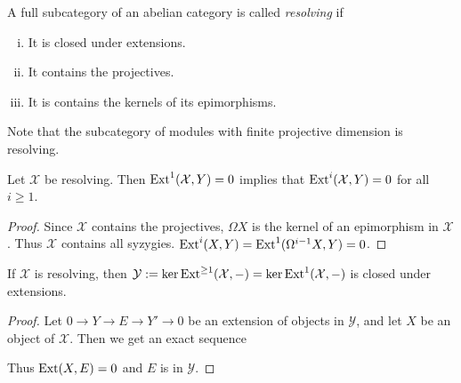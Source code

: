 
\begin{defn}[Resolving]
	A full subcategory of an abelian category is called \emph{resolving} if 
	\begin{enumerate}[i)]
		\item It is closed under extensions.
		\item It contains the projectives.
		\item It is contains the kernels of its epimorphisms.
	\end{enumerate}
\end{defn}

Note that the subcategory of modules with finite projective dimension is resolving.


\begin{lemma}\label{lem:resolving_ext_vanish}
	Let $\mathcal X$ be resolving. Then $\operatorname{Ext}^1(\mathcal X, Y) = 0$ implies that $\operatorname{Ext}^i(\mathcal X, Y)=0$ for all $i \geq 1$.
	\begin{proof}
		Since $\mathcal X$ contains the projectives, $\Omega X$ is the kernel of an epimorphism in $\mathcal X$. Thus $\mathcal X$ contains all syzygies. $\operatorname{Ext}^i(X, Y) = \operatorname{Ext}^1(\Omega^{i-1}X, Y) = 0$.
	\end{proof}
\end{lemma}

\begin{prop}\label{prop:complement_closed_under_extension}
	If $\mathcal X$ is resolving, then $\mathcal Y := \ker\operatorname{Ext}^{\geq 1}(\mathcal X, -) = \ker\operatorname{Ext}^{1}(\mathcal X, -)$ is closed under extensions.
	\begin{proof}
		Let $0 \to Y \to E \to Y' \to 0$ be an extension of objects in $\mathcal Y$, and let $X$ be an object of $\mathcal X$. Then we get an exact sequence  
		\begin{center}
		\end{center}
		Thus $\operatorname{Ext}(X, E)=0$ and $E$ is in $\mathcal Y$.
	\end{proof}
\end{prop}

